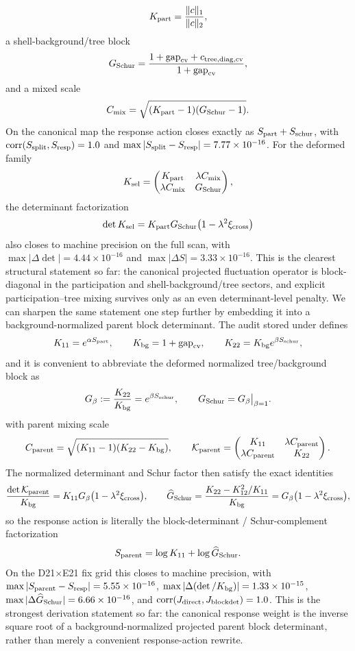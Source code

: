 \documentclass[aps,prd,onecolumn,notitlepage,nofootinbib,superscriptaddress,11pt,floatfix]{revtex4-2}
\begin{document}
\[
K_{\rm part}=\frac{\|c\|_1}{\|c\|_2},
\]
a shell-background/tree block
\[
G_{\rm Schur}=\frac{1+\mathrm{gap}_{\rm cv}+c_{{\rm tree},{\rm diag},{\rm cv}}}{1+\mathrm{gap}_{\rm cv}},
\]
and a mixed scale
\[
C_{\rm mix}=\sqrt{(K_{\rm part}-1)(G_{\rm Schur}-1)}.
\]
On the canonical map the response action closes exactly as $S_{\rm part}+S_{\rm schur}$, with $\mathrm{corr}(S_{\rm split},S_{\rm resp})=1.0$ and $\max|S_{\rm split}-S_{\rm resp}|=7.77\times10^{-16}$. For the deformed family
\[
K_{\rm sel}=
\begin{pmatrix}
K_{\rm part} & \lambda C_{\rm mix}\\
\lambda C_{\rm mix} & G_{\rm Schur}
\end{pmatrix},
\]
the determinant factorization
\[
\det K_{\rm sel}=K_{\rm part}G_{\rm Schur}\bigl(1-\lambda^2\xi_{\rm cross}\bigr)
\]
also closes to machine precision on the full scan, with $\max|\Delta\det|=4.44\times10^{-16}$ and $\max|\Delta S|=3.33\times10^{-16}$. This is the clearest structural statement so far: the canonical projected fluctuation operator is block-diagonal in the participation and shell-background/tree sectors, and explicit participation--tree mixing survives only as an even determinant-level penalty.
We can sharpen the same statement one step further by embedding it into a background-normalized parent block determinant. The audit stored under  defines
\[
K_{11}=e^{\alpha S_{\rm part}},\qquad
K_{\rm bg}=1+\mathrm{gap}_{\rm cv},\qquad
K_{22}=K_{\rm bg}e^{\beta S_{\rm schur}},
\]
and it is convenient to abbreviate the deformed normalized tree/background block as
\[
G_\beta:=\frac{K_{22}}{K_{\rm bg}}=e^{\beta S_{\rm schur}},
\qquad
G_{\rm Schur}=G_\beta\big|_{\beta=1}.
\]
with parent mixing scale
\[
C_{\rm parent}=\sqrt{(K_{11}-1)(K_{22}-K_{\rm bg})},
\qquad
\mathcal K_{\rm parent}=
\begin{pmatrix}
K_{11} & \lambda C_{\rm parent}\\
\lambda C_{\rm parent} & K_{22}
\end{pmatrix}.
\]
The normalized determinant and Schur factor then satisfy the exact identities
\[
\frac{\det\mathcal K_{\rm parent}}{K_{\rm bg}}
=
K_{11}G_\beta\bigl(1-\lambda^2\xi_{\rm cross}\bigr),
\qquad
\widehat G_{\rm Schur}
=
\frac{K_{22}-K_{12}^2/K_{11}}{K_{\rm bg}}
=
G_\beta\bigl(1-\lambda^2\xi_{\rm cross}\bigr),
\]
so the response action is literally the block-determinant / Schur-complement factorization
\[
S_{\rm parent}
=
\log K_{11}+\log \widehat G_{\rm Schur}.
\]
On the D21$\times$E21 fix grid this closes to machine precision, with $\max|S_{\rm parent}-S_{\rm resp}|=5.55\times10^{-16}$, $\max|\Delta(\det/K_{\rm bg})|=1.33\times10^{-15}$, $\max|\Delta \widehat G_{\rm Schur}|=6.66\times10^{-16}$, and $\mathrm{corr}(J_{\rm direct},J_{\rm blockdet})=1.0$. This is the strongest derivation statement so far: the canonical response weight is the inverse square root of a background-normalized projected parent block determinant, rather than merely a convenient response-action rewrite.
\end{document}
